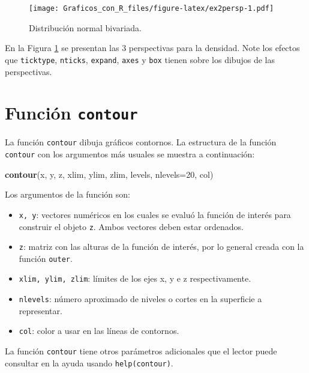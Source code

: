 \documentclass[10pt,]{krantz}
\makeatletter
\newenvironment{Shaded}{\begin{snugshade}}{\end{snugshade}}
\newcommand{\KeywordTok}[1]{\textcolor[rgb]{0.13,0.29,0.53}{\textbf{#1}}}
\newcommand{\DataTypeTok}[1]{\textcolor[rgb]{0.13,0.29,0.53}{#1}}
\newcommand{\DecValTok}[1]{\textcolor[rgb]{0.00,0.00,0.81}{#1}}
\newcommand{\NormalTok}[1]{#1}
\providecommand{\tightlist}{%
  \setlength{\itemsep}{0pt}\setlength{\parskip}{0pt}}
\newenvironment{kframe}{%
\medskip{}
\setlength{\fboxsep}{.8em}
 \def\at@end@of@kframe{}%
 \ifinner\ifhmode%
  \def\at@end@of@kframe{\end{minipage}}%
  \begin{minipage}{\columnwidth}%
 \fi\fi%
 \def\FrameCommand##1{\hskip\@totalleftmargin \hskip-\fboxsep
 \colorbox{shadecolor}{##1}\hskip-\fboxsep
     \hskip-\linewidth \hskip-\@totalleftmargin \hskip\columnwidth}%
 \MakeFramed {\advance\hsize-\width
   \@totalleftmargin\z@ \linewidth\hsize
   \@setminipage}}%
 {\par\unskip\endMakeFramed%
 \at@end@of@kframe}
\renewenvironment{Shaded}{\begin{kframe}}{\end{kframe}}
\makeatother
\begin{document}
\begin{figure}
\centering
\texttt{[image: Graficos\_con\_R\_files/figure-latex/ex2persp-1.pdf]}
\caption{\label{fig:ex2persp}Distribución normal bivariada.}
\end{figure}

En la Figura \ref{fig:ex2persp} se presentan las 3 perspectivas para la
densidad. Note los efectos que \texttt{ticktype}, \texttt{nticks},
\texttt{expand}, \texttt{axes} y \texttt{box} tienen sobre los dibujos
de las perspectivas.

\section{\texorpdfstring{Función \texttt{contour} 
}{Función contour  }}\label{funcion-contour}

La función \texttt{contour} dibuja gráficos contornos. La estructura de
la función \texttt{contour} con los argumentos más usuales se muestra a
continuación:

\begin{Shaded}
\begin{Highlighting}[]
\KeywordTok{contour}\NormalTok{(x, y, z,}
\NormalTok{        xlim, ylim, zlim,}
\NormalTok{        levels, }\DataTypeTok{nlevels=}\DecValTok{20}\NormalTok{, col)}
\end{Highlighting}
\end{Shaded}

Los argumentos de la función son:

\begin{itemize}
\tightlist
\item
  \texttt{x,\ y}: vectores numéricos en los cuales se evaluó la función
  de interés para construir el objeto \texttt{z}. Ambos vectores deben
  estar ordenados.
\item
  \texttt{z}: matriz con las alturas de la función de interés, por lo
  general creada con la función \texttt{outer}.
\item
  \texttt{xlim,\ ylim,\ zlim}: límites de los ejes x, y e z
  respectivamente.
\item
  \texttt{nlevels}: número aproximado de niveles o cortes en la
  superficie a representar.
\item
  \texttt{col}: color a usar en las líneas de contornos.
\end{itemize}

La función \texttt{contour} tiene otros parámetros adicionales que el
lector puede consultar en la ayuda usando \texttt{help(contour)}.
\end{document}
